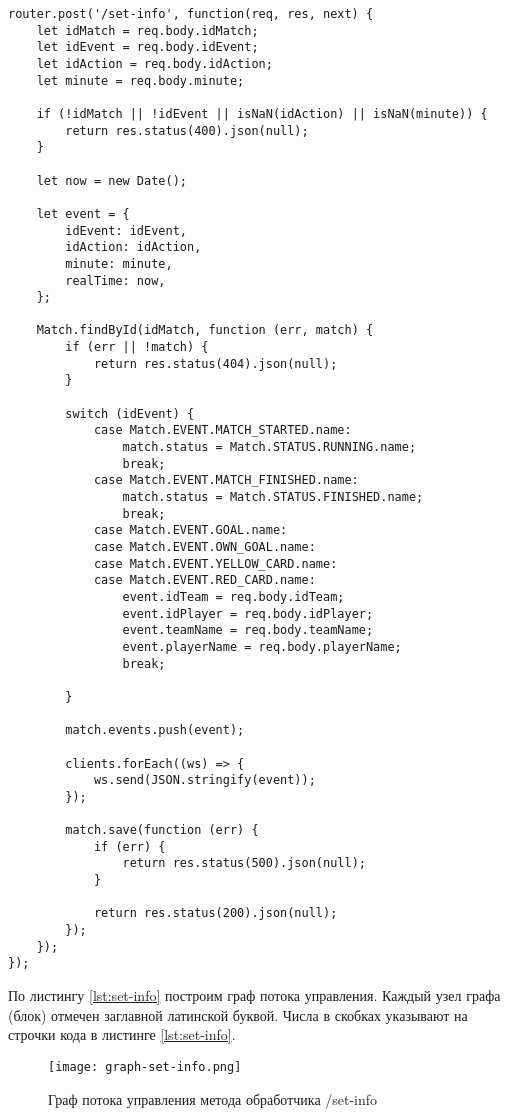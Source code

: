 \begin{lstlisting}[caption={Код метода обработчика урла /set-info}, label={lst:set-info}]
router.post('/set-info', function(req, res, next) {
    let idMatch = req.body.idMatch;
    let idEvent = req.body.idEvent;
    let idAction = req.body.idAction;
    let minute = req.body.minute;

    if (!idMatch || !idEvent || isNaN(idAction) || isNaN(minute)) {
        return res.status(400).json(null);
    }

    let now = new Date();

    let event = {
        idEvent: idEvent,
        idAction: idAction,
        minute: minute,
        realTime: now,
    };

    Match.findById(idMatch, function (err, match) {
        if (err || !match) {
            return res.status(404).json(null);
        }

        switch (idEvent) {
            case Match.EVENT.MATCH_STARTED.name:
                match.status = Match.STATUS.RUNNING.name;
                break;
            case Match.EVENT.MATCH_FINISHED.name:
                match.status = Match.STATUS.FINISHED.name;
                break;
            case Match.EVENT.GOAL.name:
            case Match.EVENT.OWN_GOAL.name:
            case Match.EVENT.YELLOW_CARD.name:
            case Match.EVENT.RED_CARD.name:
                event.idTeam = req.body.idTeam;
                event.idPlayer = req.body.idPlayer;
                event.teamName = req.body.teamName;
                event.playerName = req.body.playerName;
                break;

        }

        match.events.push(event);

        clients.forEach((ws) => {
            ws.send(JSON.stringify(event));
        });

        match.save(function (err) {
            if (err) {
                return res.status(500).json(null);
            }

            return res.status(200).json(null);
        });
    });
});
\end{lstlisting}

По листингу \ref{lst:set-info} построим граф потока управления. Каждый узел графа (блок) отмечен заглавной латинской буквой. Числа в скобках указывают на строчки кода в листинге \ref{lst:set-info}.

\begin{figure}[H]
  \centering
  \texttt{[image: graph-set-info.png]}
  \caption{Граф потока управления метода обработчика /set-info}
\end{figure}

